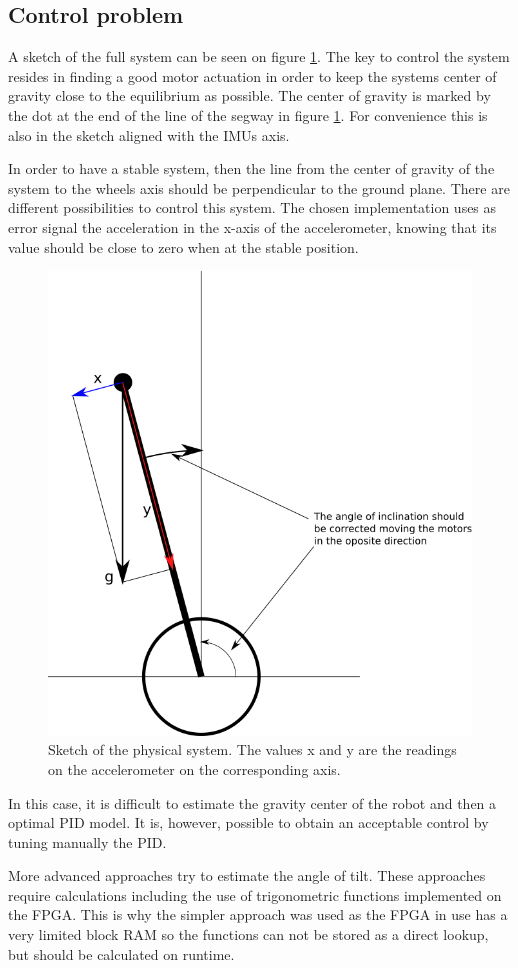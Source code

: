\subsection{Control problem}
\label{sec:controlproblem}

A sketch of the full system can be seen on figure \ref{fig:controlsch}.
The key to control the system resides in finding a good motor actuation in order to keep  the systems center of gravity close to the equilibrium as possible.
The center of gravity is marked by the dot at the end of the line of the segway in figure \ref{fig:controlsch}.
For convenience this is also in the sketch aligned with the IMUs axis.

In order to have a stable system, then the line from the center of gravity of the system to the wheels axis should be perpendicular to the ground plane.
There are different possibilities to control this system.
The chosen implementation uses as error signal the acceleration in the x-axis of the accelerometer, knowing that its value should be close to zero when at the stable position.

\begin{figure}[H]
\centering
\includegraphics[width = 0.5 \textwidth]{images/segway_scheme}
\caption[Sketch of physical system.]{Sketch of the physical system. The values x and y are the readings on the accelerometer on the corresponding axis.}
\label{fig:controlsch}
\end{figure}

In this case, it is difficult to estimate the gravity center of the robot and then a optimal PID model.
It is, however, possible to obtain an acceptable control by tuning manually the PID.

More advanced approaches try to estimate the angle of tilt.
These approaches require calculations including the use of trigonometric functions implemented on the FPGA.
This is why the simpler approach was used as the FPGA in use has a very limited block RAM so the functions can not be stored as a direct lookup, but should be calculated on runtime.